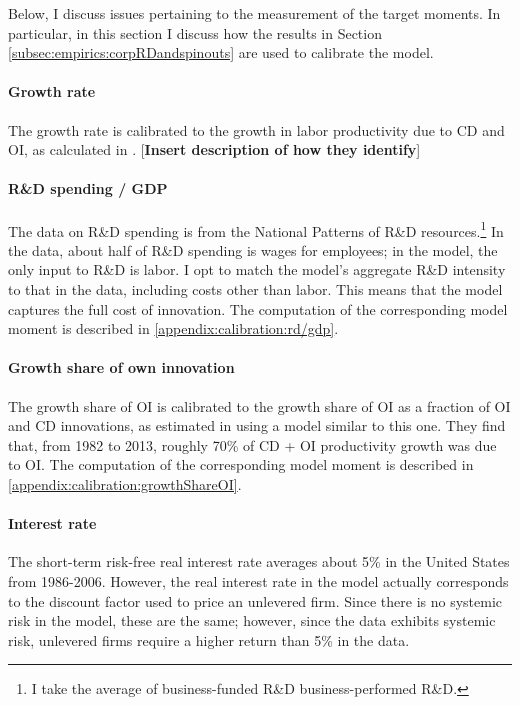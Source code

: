 \documentclass[11pt,english]{article}
\begin{document}
Below, I discuss issues pertaining to the measurement of the target moments. In particular, in this section I discuss how the results in Section \ref{subsec:empirics:corpRDandspinouts} are used to calibrate the model.

\paragraph{Growth rate}

The growth rate is calibrated to the growth in labor productivity due to CD and OI, as calculated in \cite{klenow_innovative_2020}. [\textbf{Insert description of how they identify}]

\paragraph{R\&D spending / GDP}

The data on R\&D spending is from the National Patterns of R\&D resources.\footnote{I take the average of business-funded R\&D business-performed R\&D.} In the data, about half of R\&D spending is wages for employees; in the model, the only input to R\&D is labor. I opt to match the model's aggregate R\&D intensity to that in the data, including costs other than labor. This means that the model captures the full cost of innovation. The computation of the corresponding model moment is described in \ref{appendix:calibration:rd/gdp}.

\paragraph{Growth share of own innovation}

The growth share of OI is calibrated to the growth share of OI as a fraction of OI and CD innovations, as estimated in \cite{klenow_innovative_2020} using a model similar to this one. They find that, from 1982 to 2013, roughly 70\% of CD + OI productivity growth was due to OI. The computation of the corresponding model moment is described in \ref{appendix:calibration:growthShareOI}.


\paragraph{Interest rate}

The short-term risk-free real interest rate averages about 5\% in the United States from 1986-2006. However, the real interest rate in the model actually corresponds to the discount factor used to price an unlevered firm. Since there is no systemic risk in the model, these are the same; however, since the data exhibits systemic risk, unlevered firms require a higher return than 5\% in the data. 
\end{document}

